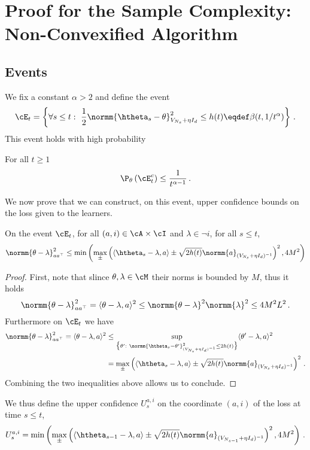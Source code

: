 \section{Proof for the Sample Complexity: Non-Convexified Algorithm}\label{app:lgc.proof_nc}

\subsection{Events}\label{app:lgc.proof_nc.events}
We fix a constant $\alpha>2$ and define the event
\[
\cE_t = \left\{\forall s \leq  t:\ \frac{1}{2}\normm{\htheta_s-\theta}^2_{V_{N_s}+\eta I_d} \leq h(t)\eqdef \beta(t,1/t^\alpha)\right\}\,.
\]
This event holds with high probability
\begin{lemma}
\label{lem:prb_Et_nc}
For all $t \geq 1$
\[
\P_\theta\left(\cE_t^c\right)\leq \frac{1}{t^{\alpha-1}}\,.
\]
\end{lemma}
We now prove that we can construct, on this event, upper confidence bounds on the loss given to the learners.
\begin{lemma}
\label{lem:confidence_bound_general_nc}
On the event $\cE_t$, for all $(a,i)\in\cA\times\cI$ and $\lambda\in\neg i$, for all $s\leq t$,
\[
\normm{\theta-\lambda}^2_{aa^\top} \leq \min\left(\max_\pm \left( \langle \htheta_{s} - \lambda,a\rangle \pm \sqrt{2 h(t)} \normm{a}_{(V_{N_s}+ \eta I_d)^{-1}} \right)^2,4M^2\right)
\]
\end{lemma}
\begin{proof}
First, note that slince $\theta,\lambda\in\cM$ their norms is bounded by $M$, thus it holds
\[
\normm{\theta-\lambda}^2_{aa^\top} = \langle\theta-\lambda,a \rangle^2 \leq \normm{\theta-\lambda}^2 \normm{\lambda}^2 \leq 4M^2L^2\,.
\]
Furthermore on $\cE_t$ we have
\begin{align*}
\normm{\theta-\lambda}^2_{aa^\top} = \langle\theta-\lambda,a \rangle^2 &\leq \sup_{\big\{\theta':\ \normm{\htheta_s-\theta'}^2_{(V_{N_s} + \eta I_d)^{-1} } \leq 2h(t)\big\}} \langle\theta'-\lambda,a \rangle^2\\
&=\max_\pm \left( \langle \htheta_{s} - \lambda,a\rangle \pm \sqrt{2 h(t)} \normm{a}_{(V_{N_s}+ \eta I_d)^{-1}} \right)^2\,.
\end{align*}
Combining the two inequalities above allows us to conclude.
\end{proof}
We thus define the upper confidence $U_s^{a,i}$ on the coordinate $(a,i)$ of the loss at time $s\leq t$,
\begin{equation}
\label{eq:def_ucb_br_general_nc}
U_s^{a,i} = \min\left(\max_\pm \left( \langle \htheta_{s-1} - \lambda,a\rangle \pm \sqrt{2 h(t)} \normm{a}_{(V_{N_{s-1}}+ \eta I_d)^{-1}} \right)^2,4M^2\right)\,.
\end{equation}

